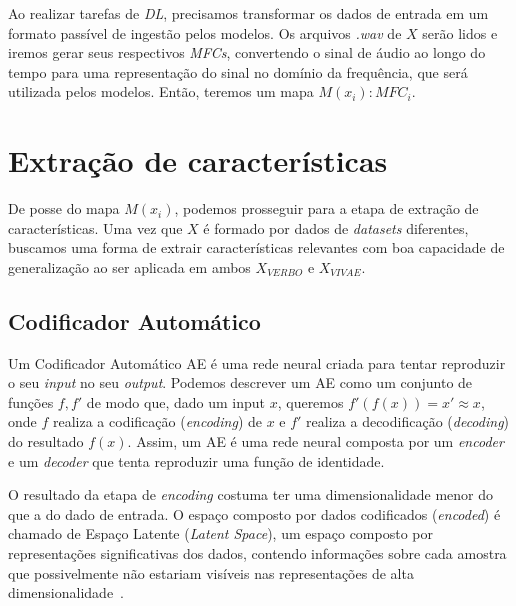Ao realizar tarefas de \textit{DL}, precisamos transformar os dados de entrada em um formato passível de ingestão pelos modelos. Os arquivos \textit{.wav} de $X$ serão lidos e iremos gerar seus respectivos \textit{MFCs}, convertendo o sinal de áudio ao longo do tempo para uma representação do sinal no domínio da frequência, que será utilizada pelos modelos. Então, teremos um mapa $M(x_i): MFC_i$.


\section{Extração de características}

De posse do mapa $M(x_i)$, podemos prosseguir para a etapa de extração de características. Uma vez que $X$ é formado por dados de \textit{datasets} diferentes, buscamos uma forma de extrair características relevantes com boa capacidade de generalização ao ser aplicada em ambos $X_{VERBO}$ e $X_{VIVAE}$.

\subsection{Codificador Automático}

Um Codificador Automático \acrlong{AE} é uma rede neural criada para tentar reproduzir o seu \textit{input} no seu \textit{output}. Podemos descrever um \acrshort{AE} como um conjunto de funções $f, f'$ de modo que, dado um input $x$, queremos $f'(f(x)) = x' \approx x$, onde $f$ realiza a codificação (\textit{encoding}) de $x$ e $f'$ realiza a decodificação (\textit{decoding}) do resultado $f(x)$. Assim, um \acrshort{AE} é uma rede neural composta por um \textit{encoder} e um \textit{decoder} que tenta reproduzir uma função de identidade.


O resultado da etapa de \textit{encoding} costuma ter uma dimensionalidade menor do que a do dado de entrada. O espaço composto por dados codificados (\textit{encoded}) é chamado de Espaço Latente (\textit{Latent Space}), um espaço composto por representações significativas dos dados, contendo informações sobre cada amostra que possivelmente não estariam visíveis nas representações de alta dimensionalidade~\cite{60}.

